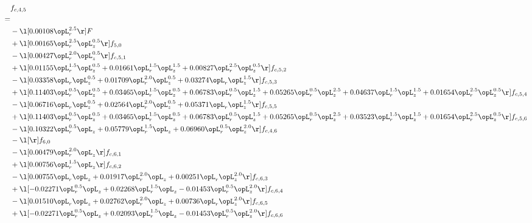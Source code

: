 \begin{alignat}{2} 
\label{eq:f_45_2} 
& f_{c,4,5} \nonumber \\ 
 = \\ 
& - \l[  0.00108 \opL_r^{2.5}  \r] F \nonumber \\ 
& + \l[  0.00165 \opL_r^{2.5} \opL_z^{0.5}  \r] f_{5,0} \nonumber \\ 
& - \l[  0.00427 \opL_r^{2.0} \opL_z^{0.5}  \r] f_{c,5,1} \nonumber \\ 
& + \l[  0.01155 \opL_r^{1.5} \opL_z^{0.5} +  0.01661 \opL_r^{1.5} \opL_z^{1.5} +  0.00827 \opL_r^{2.5} \opL_z^{0.5}  \r] f_{c,5,2} \nonumber \\ 
& - \l[  0.03358 \opL_r \opL_z^{0.5} +  0.01709 \opL_r^{2.0} \opL_z^{0.5} +  0.03274 \opL_r \opL_z^{1.5}  \r] f_{c,5,3} \nonumber \\ 
& + \l[  0.11403 \opL_r^{0.5} \opL_z^{0.5} +  0.03465 \opL_r^{1.5} \opL_z^{0.5} +  0.06783 \opL_r^{0.5} \opL_z^{1.5} +  0.05265 \opL_r^{0.5} \opL_z^{2.5} +  0.04637 \opL_r^{1.5} \opL_z^{1.5} +  0.01654 \opL_r^{2.5} \opL_z^{0.5}  \r] f_{c,5,4} \nonumber \\ 
& - \l[  0.06716 \opL_r \opL_z^{0.5} +  0.02564 \opL_r^{2.0} \opL_z^{0.5} +  0.05371 \opL_r \opL_z^{1.5}  \r] f_{c,5,5} \nonumber \\ 
& + \l[  0.11403 \opL_r^{0.5} \opL_z^{0.5} +  0.03465 \opL_r^{1.5} \opL_z^{0.5} +  0.06783 \opL_r^{0.5} \opL_z^{1.5} +  0.05265 \opL_r^{0.5} \opL_z^{2.5} +  0.03523 \opL_r^{1.5} \opL_z^{1.5} +  0.01654 \opL_r^{2.5} \opL_z^{0.5}  \r] f_{c,5,6} \nonumber \\ 
& - \l[  0.10322 \opL_r^{0.5} \opL_z +  0.05779 \opL_r^{1.5} \opL_z +  0.06960 \opL_r^{0.5} \opL_z^{2.0}  \r] f_{c,4,6} \nonumber \\ 
& - \l[  \r] f_{6,0} \nonumber \\ 
& - \l[  0.00479 \opL_r^{2.0} \opL_z  \r] f_{c,6,1} \nonumber \\ 
& + \l[  0.00756 \opL_r^{1.5} \opL_z  \r] f_{c,6,2} \nonumber \\ 
& - \l[  0.00755 \opL_r \opL_z +  0.01917 \opL_r^{2.0} \opL_z +  0.00251 \opL_r \opL_z^{2.0}  \r] f_{c,6,3} \nonumber \\ 
& + \l[  -0.02271 \opL_r^{0.5} \opL_z +  0.02268 \opL_r^{1.5} \opL_z   -0.01453 \opL_r^{0.5} \opL_z^{2.0}  \r] f_{c,6,4} \nonumber \\ 
& - \l[  0.01510 \opL_r \opL_z +  0.02762 \opL_r^{2.0} \opL_z +  0.00736 \opL_r \opL_z^{2.0}  \r] f_{c,6,5} \nonumber \\ 
& + \l[  -0.02271 \opL_r^{0.5} \opL_z +  0.02093 \opL_r^{1.5} \opL_z   -0.01453 \opL_r^{0.5} \opL_z^{2.0}  \r] f_{c,6,6} \nonumber \\ 
\end{alignat} 



